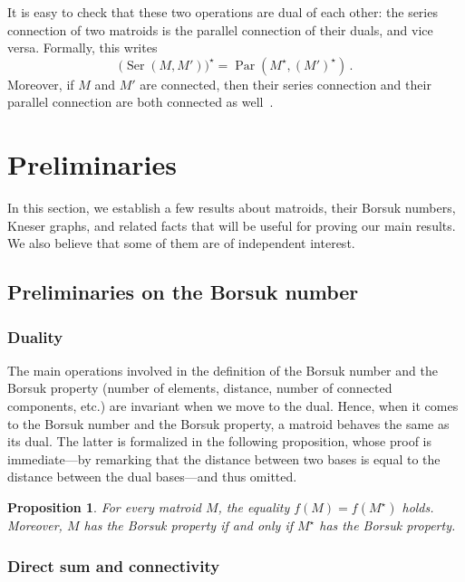 \documentclass[12pt]{amsart}
\theoremstyle{plain}
\newtheorem{proposition}[theorem]{Proposition}
\theoremstyle{definition}
\theoremstyle{remark}
\newcommand{\Ser}{\operatorname{Ser}}
\newcommand{\Par}{\operatorname{Par}}
\begin{document}
It is easy to check that these two operations are dual of each other: the series connection of two matroids is the parallel connection of their duals, and vice versa. Formally, this writes
\begin{equation}\label{eq:ser-par}
\bigl(\Ser(M,M')\bigl)^\star = \Par(M^\star,(M')^\star) \, . 
\end{equation} Moreover, if $M$ and $M'$ are connected, then their series connection and their parallel connection are both connected as well~\cite[Proposition 7.1.17]{oxley2011matroid}.

\section{Preliminaries}\label{sec:prel}

In this section, we establish a few results about matroids, their Borsuk numbers, Kneser graphs, and related facts that will be useful for proving our main results. We also believe that some of them are of independent interest.

\subsection{Preliminaries on the Borsuk number}

\subsubsection{Duality}

The main operations involved in the definition of the Borsuk number and the Borsuk property (number of elements, distance, number of connected components, etc.) are invariant when we move to the dual. Hence, when it comes to the Borsuk number and the Borsuk property, a matroid behaves the same as its dual. The latter is formalized in the following proposition, whose proof is immediate---by remarking that the distance between two bases is equal to the distance between the dual bases---and thus omitted.

\begin{proposition}\label{prop:dual}
For every matroid $M$, the equality $f(M) = f(M^\star)$ holds. Moreover, $M$ has the Borsuk property if and only if $M^\star$ has the Borsuk property.
\end{proposition}

\subsubsection{Direct sum and connectivity}
\end{document}
